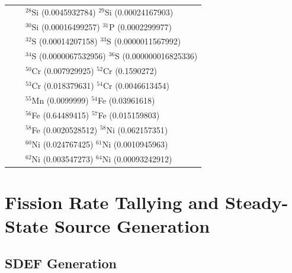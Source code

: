 \begin{table}[h]
\begin{tabular}{ r c l }
& &            $^{28}$Si (0.0045932784) $^{29}$Si  (0.00024167903) \\
& &            $^{30}$Si  (0.00016499257) $^{31}$P  (0.0002299977) \\
& &            $^{32}$S  (0.00014207158)  $^{33}$S  (0.0000011567992) \\
& &            $^{34}$S  (0.0000067532956) $^{36}$S  (0.000000016825336) \\
& &            $^{50}$Cr  (0.007929925)   $^{52}$Cr  (0.1590272) \\
& &            $^{53}$Cr  (0.018379631)   $^{54}$Cr  (0.0046613454) \\
& &            $^{55}$Mn  (0.0099999)   $^{54}$Fe  (0.03961618) \\
& &            $^{56}$Fe  (0.64489415)   $^{57}$Fe  (0.015159803) \\
& &            $^{58}$Fe  (0.0020528512)  $^{58}$Ni  (0.062157351) \\
& &            $^{60}$Ni  (0.024767425)  $^{61}$Ni  (0.0010945963) \\
& &            $^{62}$Ni  (0.003547273)  $^{64}$Ni  (0.00093242912) \\
\bottomrule
\end{tabular}
\end{table}

\clearpage

\section{Fission Rate Tallying and Steady-State Source Generation}
\subsection{SDEF Generation}

